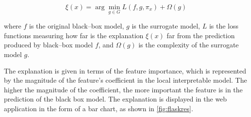         \begin{equation}\label{eq}
            \xi(x) = \arg\min_{g \in G} L(f, g, \pi_x) + \Omega(g)
        \end{equation}
        
        where $f$ is the original black--box model, $g$ is the surrogate model, $L$ is the loss functions measuring how far is the explanation $\xi(x)$ far from the prediction produced by black--box model $f$, and $\Omega(g)$ is the complexity of the surrogate model $g$.
        
        
        The explanation is given in terms of the feature importance, which is represented by the magnitude of the feature's coefficient in the local interpretable model. The higher the magnitude of the coefficient, the more important the feature is in the prediction of the black box model. The explanation is displayed in the web application in the form of a bar chart, as shown in \autoref{fig:flaskres}.
        
        